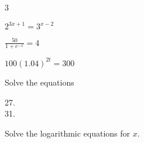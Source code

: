 \begin{description}
\begin {multicols}{3}
\item [21.] $2^{3 x +1} =3^{x -2}$ 

\item [23.] $\frac{50}{1 +e^{ -x}} =4$ 
\end {multicols}
 

\item [25.]
$100 \left (1.04\right )^{2 t} =300$ \end{description}

Solve the equations 


\begin{description}
\item [27.]   
\columnsep =30pt
 

\item [31.]
\columnsep =30pt
 \end{description}

Solve the logarithmic equations for $x$. 


